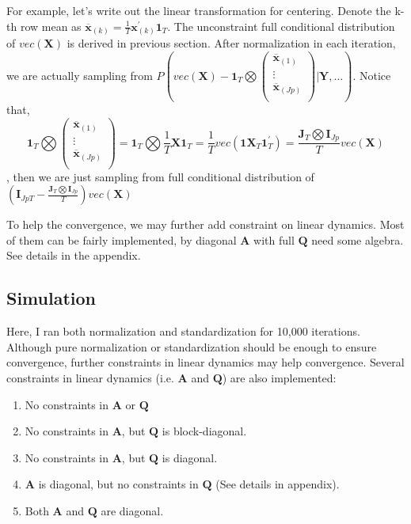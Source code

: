 \documentclass[]{article}
\begin{document}
For example, let's write out the linear transformation for centering. Denote the k-th row mean as
\({\overline{\mathbf{x}}}_{(k)} = \frac{1}{T}\mathbf{x}_{(k)}^{'}\mathbf{1}_{T}\). The unconstraint full conditional distribution of \(vec(\mathbf{X})\) is derived in previous section. After
normalization in each iteration, we are actually sampling from
\(P(vec(\mathbf{X}) - \mathbf{1}_{T}\bigotimes\begin{pmatrix}
	{\overline{\mathbf{x}}}_{(1)} \\
	\vdots \\
	{\overline{\mathbf{x}}}_{(Jp)} \\
\end{pmatrix}|\mathbf{Y},\ldots)\). Notice that,
\[\mathbf{1}_{T}\bigotimes\begin{pmatrix}
	{\overline{\mathbf{x}}}_{(1)} \\
	\vdots \\
	{\overline{\mathbf{x}}}_{(Jp)} \\
\end{pmatrix} = \mathbf{1}_{T}\bigotimes\frac{1}{T}\mathbf{X1}_{T} = \frac{1}{T}vec\left( \mathbf{1X}_{T}\mathbf{1}_{T}^{'} \right) = \frac{\mathbf{J}_{T}\bigotimes \mathbf{I}_{Jp}}{T}vec(\mathbf{X})\]
, then we are just sampling from full conditional distribution of
\((\mathbf{I}_{JpT} - \frac{\mathbf{J}_{T}\bigotimes \mathbf{I}_{Jp}}{T})vec(\mathbf{X})\)

To help the convergence, we may further add constraint on linear dynamics. Most of them can be fairly implemented, by diagonal $\mathbf{A}$ with full $\mathbf{Q}$ need some algebra. See details in the appendix.

\subsection{Simulation}
Here, I ran both normalization and standardization for 10,000 iterations. Although pure normalization or standardization should be enough to ensure convergence, further constraints in linear dynamics may help convergence.
Several constraints in linear dynamics (i.e. $\bm{A}$ and $\bm{Q}$) are also implemented:
\begin{enumerate}
	\def\labelenumi{(\arabic{enumi})}
	\item
	No constraints in $\bm{A}$ or $\bm{Q}$
	\item
	No constraints in $\bm{A}$, but $\bm{Q}$ is block-diagonal.
	\item
	No constraints in $\bm{A}$, but $\bm{Q}$ is diagonal.
	\item
	$\bm{A}$ is diagonal, but no constraints in $\bm{Q}$
	(See details in appendix).
	\item
	Both $\bm{A}$ and $\bm{Q}$ are diagonal.
\end{enumerate}
\end{document}
